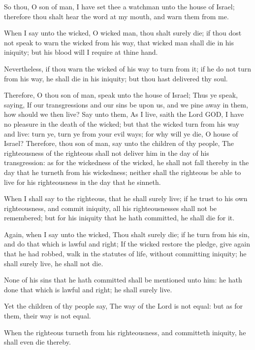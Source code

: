 \Verse So thou, O son of man, I have set thee a watchman unto the house of Israel; therefore thou shalt hear the word at my mouth, and warn them from me.

\Verse When I say unto the wicked, O wicked man, thou shalt surely die; if thou dost not speak to warn the wicked from his way, that wicked man shall die in his iniquity; but his blood will I require at thine hand.

\Verse Nevertheless, if thou warn the wicked of his way to turn from it; if he do not turn from his way, he shall die in his iniquity; but thou hast delivered thy soul.

\Verse Therefore, O thou son of man, speak unto the house of Israel; Thus ye speak, saying, If our transgressions and our sins be upon us, and we pine away in them, how should we then live?  \Verse Say unto them, As I live, saith the Lord GOD, I have no pleasure in the death of the wicked; but that the wicked turn from his way and live: turn ye, turn ye from your evil ways; for why will ye die, O house of Israel?  \Verse Therefore, thou son of man, say unto the children of thy people, The righteousness of the righteous shall not deliver him in the day of his transgression: as for the wickedness of the wicked, he shall not fall thereby in the day that he turneth from his wickedness; neither shall the righteous be able to live for his righteousness in the day that he sinneth.

\Verse When I shall say to the righteous, that he shall surely live; if he trust to his own righteousness, and commit iniquity, all his righteousnesses shall not be remembered; but for his iniquity that he hath committed, he shall die for it.

\Verse Again, when I say unto the wicked, Thou shalt surely die; if he turn from his sin, and do that which is lawful and right; \Verse If the wicked restore the pledge, give again that he had robbed, walk in the statutes of life, without committing iniquity; he shall surely live, he shall not die.

\Verse None of his sins that he hath committed shall be mentioned unto him: he hath done that which is lawful and right; he shall surely live.

\Verse Yet the children of thy people say, The way of the Lord is not equal: but as for them, their way is not equal.

\Verse When the righteous turneth from his righteousness, and committeth iniquity, he shall even die thereby.

